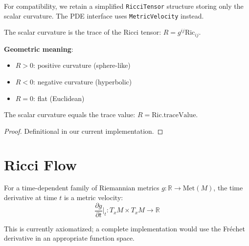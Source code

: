 \begin{definition}
\label{def:ricci_tensor}
\leanok
{}
For compatibility, we retain a simplified \texttt{RicciTensor} structure storing only the scalar curvature. The PDE interface uses \texttt{MetricVelocity} instead.
\end{definition}

\begin{definition}
\label{def:scalar_curvature}
\leanok
{}
The scalar curvature is the trace of the Ricci tensor: $R = g^{ij} \mathrm{Ric}_{ij}$.

\textbf{Geometric meaning}:
\begin{itemize}
\item $R > 0$: positive curvature (sphere-like)
\item $R < 0$: negative curvature (hyperbolic)
\item $R = 0$: flat (Euclidean)
\end{itemize}
\end{definition}

\begin{lemma}
\label{lem:scalar_curvature_eq}
\leanok
{}
The scalar curvature equals the trace value: $R = \mathrm{Ric}.\mathrm{traceValue}$.
\end{lemma}

\begin{proof}
\leanok
Definitional in our current implementation.
\end{proof}

\chapter{Ricci Flow}
\label{chap:flow}

\begin{definition}
\label{def:time_deriv}
For a time-dependent family of Riemannian metrics $g : \mathbb{R} \to \mathrm{Met}(M)$, the time derivative at time $t$ is a metric velocity:
\[ \frac{\partial g}{\partial t}\Big|_t : T_xM \times T_xM \to \mathbb{R} \]

This is currently axiomatized; a complete implementation would use the Fr\'echet derivative in an appropriate function space.
\end{definition}

